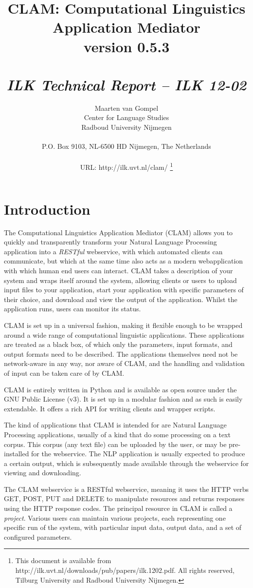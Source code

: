 \documentclass[a4paper,12pt]{report}
\author{Maarten van Gompel \\
	Center for Language Studies \\
	Radboud University Nijmegen \\ \\
    {\small P.O. Box 9103, NL-6500 HD Nijmegen, The Netherlands} \\ \\         
        URL: http://ilk.uvt.nl/clam/ \thanks{This document is available from
	    http://ilk.uvt.nl/downloads/pub/papers/ilk.1202.pdf. All rights reserved, Tilburg University and 
        Radboud University Nijmegen.}}
\title{{\huge CLAM: Computational Linguistics Application Mediator} \\ \vspace*{0.5cm}
{\bf \small version 0.5.3} \\ \vspace*{0.5cm}{\huge Documentation}\\
\vspace*{1cm} {\it ILK Technical Report -- ILK 12-02}}
\begin{document}
\sffamily

\maketitle
\tableofcontents

\chapter{Introduction} 

The Computational Linguistics Application Mediator (CLAM) allows you to quickly and transparently transform your Natural Language Processing application into a \emph{RESTful}\/ webservice, with which automated clients can communicate, but which at the same time also acts as a modern webapplication with which human end users can interact. CLAM takes a description of your system and wraps itself around the system, allowing clients or users to upload input files to your application, start your application with specific parameters of their choice, and download and view the output of the application. Whilst the application runs, users can monitor its status.

CLAM is set up in a universal fashion, making it flexible enough to be wrapped around a wide range of computational linguistic applications. These applications are treated as a black box, of which only the parameters, input formats, and output formats need to be described. The applications themselves need not be network-aware in any way, nor aware of CLAM, and the handling and validation of input can be taken care of by CLAM.

CLAM is entirely written in Python and is available as open source under the GNU Public License (v3). It is set up in a modular fashion and as such is easily extendable. It offers a rich API for writing clients and wrapper scripts.

The kind of applications that CLAM is intended for are Natural Language Processing applications, usually of a kind that do some processing on a text corpus. This corpus (any text file) can be uploaded by the user, or may be pre-installed for the webservice. The NLP application is usually expected to produce a certain output, which is subsequently made available through the webservice for viewing and downloading.

The CLAM webservice is a RESTful webservice, meaning it uses the HTTP verbs GET, POST, PUT and DELETE to manipulate resources and returns responses using the HTTP response codes. The principal resource in CLAM is called a \emph{project}. Various users can maintain various projects, each representing one specific run of the system, with particular input data, output data, and a set of configured parameters.
\end{document}
